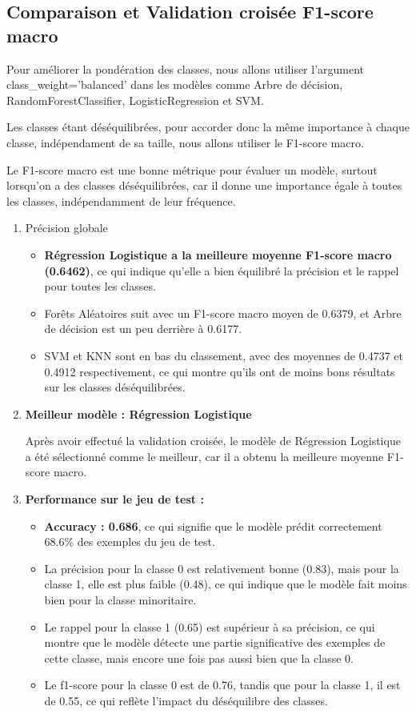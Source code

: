 \subsection{Comparaison et Validation croisée F1-score macro}
\begin{flushleft}
Pour améliorer la pondération des classes, nous allons utiliser l'argument class\_weight='balanced' dans les modèles comme Arbre de décision, RandomForestClassifier, LogisticRegression et SVM. 

Les classes étant déséquilibrées, pour accorder donc la même importance à chaque classe, indépendament de sa taille, nous allons utiliser le F1-score macro. 

Le F1-score macro est une bonne métrique pour évaluer un modèle, surtout lorsqu'on a des classes déséquilibrées, car il donne une importance égale à toutes les classes, indépendamment de leur fréquence.

\begin{enumerate}
\item Précision globale
\begin{itemize}
\item \textbf{Régression Logistique a la meilleure moyenne F1-score macro (0.6462)}, ce qui indique qu'elle a bien équilibré la précision et le rappel pour toutes les classes.
\item Forêts Aléatoires suit avec un F1-score macro moyen de 0.6379, et Arbre de décision est un peu derrière à 0.6177.
\item SVM et KNN sont en bas du classement, avec des moyennes de 0.4737 et 0.4912 respectivement, ce qui montre qu'ils ont de moins bons résultats sur les classes déséquilibrées.
\end{itemize}

\item \textbf{Meilleur modèle : Régression Logistique}

Après avoir effectué la validation croisée, le modèle de Régression Logistique a été sélectionné comme le meilleur, car il a obtenu la meilleure moyenne F1-score macro.

\item \textbf{Performance sur le jeu de test :}
\begin{itemize}
\item \textbf{Accuracy : 0.686}, ce qui signifie que le modèle prédit correctement 68.6\% des exemples du jeu de test.
\item La précision pour la classe 0 est relativement bonne (0.83), mais pour la classe 1, elle est plus faible (0.48), ce qui indique que le modèle fait moins bien pour la classe minoritaire.
\item Le rappel pour la classe 1 (0.65) est supérieur à sa précision, ce qui montre que le modèle détecte une partie significative des exemples de cette classe, mais encore une fois pas aussi bien que la classe 0.
\item Le f1-score pour la classe 0 est de 0.76, tandis que pour la classe 1, il est de 0.55, ce qui reflète l'impact du déséquilibre des classes.
\end{itemize}
\end{enumerate}
\end{flushleft}

